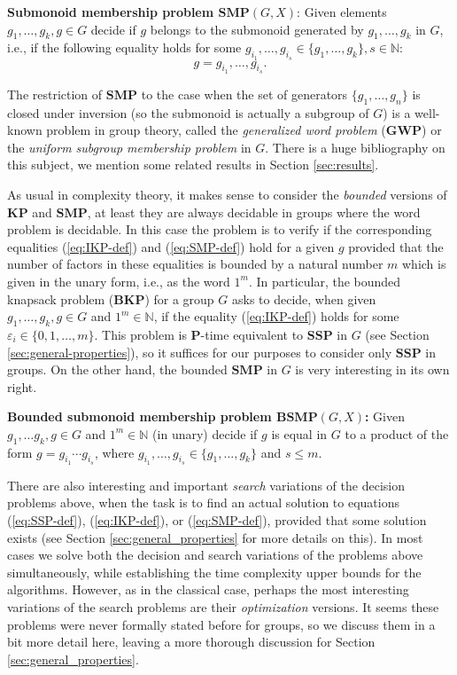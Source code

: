 \documentclass[10pt]{amsart}
\theoremstyle{definition}
\def\P{{\mathbf{P}}}
\def\SSP{{\mathbf{SSP}}}
\def\SMP{{\mathbf{SMP}}}
\def\BSMP{{\mathbf{BSMP}}}
\def\BKP{{\mathbf{BKP}}}
\def\KP{{\mathbf{KP}}}
\def\GWP{{\mathbf{GWP}}}
\begin{document}
\medskip
\noindent
{\bf Submonoid membership problem $\mathbf{SMP}(G,X)$\index{$\SMP(G,X)$}}:  Given elements $g_1,\ldots,g_k,g\in G$
decide if $g$ belongs to the submonoid generated by $g_1, \ldots, g_k$ in $G$, i.e., if the following equality holds for some $g_{i_1}, \ldots, g_{i_s} \in \{g_1, \ldots, g_k\}, s \in \mathbb{N}$:
\begin{equation}\label{eq:SMP-def}
g = g_{i_1}, \ldots, g_{i_s}.
\end{equation}

\medskip
The restriction of $\SMP$ to the case when the set of generators $\{g_1, \ldots,g_n\}$ is closed under inversion (so the submonoid is actually a subgroup of $G$) is  a well-known problem in group theory, called the {\em generalized word problem} ($\GWP$) or the {\em uniform subgroup membership problem} in $G$. There is a huge bibliography on this subject, we mention some related results  in Section \ref{sec:results}.

As usual in complexity theory, it makes sense to consider the {\em bounded} versions of $\KP$ and $\SMP$, at least they are always decidable in groups where the word problem is decidable. In this case the problem is to verify  if the corresponding equalities (\ref{eq:IKP-def}) and  (\ref{eq:SMP-def}) hold for a given $g$ provided that the number of factors in these equalities  is bounded by a natural number $m$ which is given in the unary form, i.e., as the word $1^m$. In particular, the bounded knapsack problem ($\BKP$) for a group $G$ asks to decide, when  given $g_1,\ldots,g_k,g\in G$ and $1^m\in\mathbb N$, if the equality (\ref{eq:IKP-def}) holds for some
$\varepsilon_i \in \{0,1, \ldots, m \}$.
This problem  is  $\P$-time equivalent to  $\SSP$ in $G$ (see Section \ref{sec:general-properties}), so it suffices for our purposes to consider only $\SSP$ in groups.
On the other hand,  the bounded $\SMP$ in $G$ is very interesting in its own right.


\medskip \noindent
{\bf Bounded submonoid membership problem $\BSMP(G,X)$\index{$\BSMP(G,X)$}:}
Given $g_1, \ldots g_k, g \in G$ and $1^m \in \mathbb{N}$ (in unary)
decide if $g$ is equal in $G$ to a product of the form
$g=g_{i_1}\cdots g_{i_s}$, where $g_{i_1}, \ldots, g_{i_s} \in \{g_1, \ldots, g_k\}$ and  $s\le m$.


\medskip
There are also  interesting and important {\it search} variations of the decision problems above,
when the task is to find an actual solution to equations (\ref{eq:SSP-def}), (\ref{eq:IKP-def}), or (\ref{eq:SMP-def}), provided that some solution  exists (see Section \ref{sec:general_properties} for more details on this). In most cases we solve both the decision and search variations of the problems above simultaneously, while establishing the time complexity upper bounds for the algorithms.  However, as in the classical case, perhaps the most interesting variations  of the search problems are their {\it optimization} versions. It seems these problems were never formally stated before for groups, so we discuss them in a bit more detail here, leaving a more thorough discussion for Section \ref{sec:general_properties}.
\end{document}
